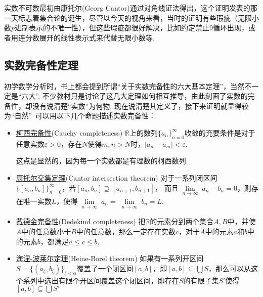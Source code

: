 \documentclass[main.tex]{subfiles}
\begin{document}
实数不可数最初由康托尔(Georg Cantor)通过对角线证法得出，这个证明发表的那一天标志着集合论的诞生，尽管以今天的视角来看，当时的证明有些瑕疵（无限小数\(p\)进制表示的不唯一性），但这些瑕疵都很好解决，比如约定禁止\(9\)循环出现，或者用连分数展开的线性表示式来代替无限小数等.


\subsection{实数完备性定理}

初学数学分析时，书上都会提到所谓“关于实数完备性的六大基本定理”，当然不一定是“六大”. 不少教材只是讨论了这几大定理如何相互推导，由此刻画了实数的完备性，却没有说清楚“实数”为何物. 现在说清楚其定义了，接下来证明就显得较为“自然”. 可以用以下几个命题描述实数完备性：

\begin{itemize}
    \item \uline{柯西完备性}(Cauchy completeness) \newline
    \(\mathbb{R}\)上的数列\(\{a_n\}_{n=0}^{\infty}\)收敛的充要条件是对于任意实数\(\varepsilon>0\)，存在\(N\)使得\(m,n>N\)时，\(|a_n-a_m| < \varepsilon\).

    \begin{note}
        这点是显然的，因为每一个实数都是有理数的柯西数列.
    \end{note}
    
    \item \uline{康托尔交集定理}(Cantor intersection theorem) \newline
    对于一系列闭区间\(\{[a_n,b_n]\}_{n=0}^{\infty}\)，若\([a_n,b_n]\supseteq [a_{n+1},b_{n+1}]\)， 而且\(\lim \limits_{\substack{n \to \infty}}a_n-b_n=0\)，则存在唯一实数\(L\)，使得\(\lim \limits_{\substack{n\to\infty}}a_n=\lim \limits_{\substack{n\to\infty}}b_n=L\).

    \item \uline{戴德金完备性}(Dedekind completeness) \newline
    把\(\mathbb{R}\)的元素分到两个集合\(A,B\)中，并使\(A\)中的任意数小于\(B\)中的任意数，那么一定存在实数\(c\)，对于\(A\)中的元素\(a\)和\(b\)中的元素\(b\)，都满足\(a\leq c\leq b\).
    
    \item \uline{海涅-波莱尔定理}(Heine-Borel theorem) \newline
    如果有一系列开区间\(S=\{(a_\xi,b_\xi)\}_{\xi < \alpha}\)覆盖了一个闭区间\([a,b]\)，即\([a,b] \subseteq \bigcup S\)，那么可以从这个系列中选出有限个开区间覆盖这个闭区间，即存在\(S\)的有限子集\(S'\)使得\([a,b] \subseteq \bigcup S'\)


\end{itemize}
\end{document}

